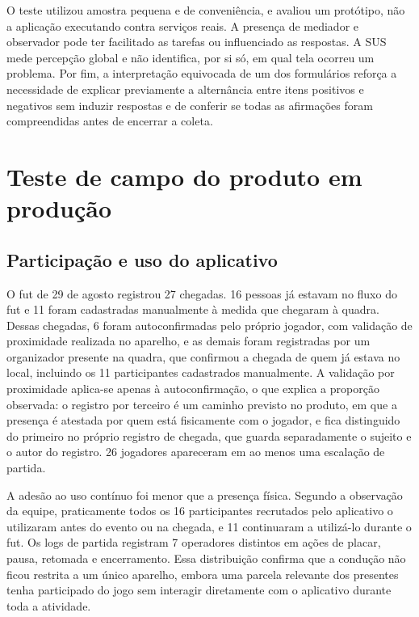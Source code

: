         O teste utilizou amostra pequena e de conveniência, e avaliou um protótipo, não a aplicação executando contra serviços reais. A presença de mediador e observador pode ter facilitado as tarefas ou influenciado as respostas. A SUS mede percepção global e não identifica, por si só, em qual tela ocorreu um problema. Por fim, a interpretação equivocada de um dos formulários reforça a necessidade de explicar previamente a alternância entre itens positivos e negativos sem induzir respostas e de conferir se todas as afirmações foram compreendidas antes de encerrar a coleta.

\section{Teste de campo do produto em produção}

    \subsection{Participação e uso do aplicativo}

        O fut de 29 de agosto registrou 27 chegadas. 16 pessoas já estavam no fluxo do fut e 11 foram cadastradas manualmente à medida que chegaram à quadra. Dessas chegadas, 6 foram autoconfirmadas pelo próprio jogador, com validação de proximidade realizada no aparelho, e as demais foram registradas por um organizador presente na quadra, que confirmou a chegada de quem já estava no local, incluindo os 11 participantes cadastrados manualmente. A validação por proximidade aplica-se apenas à autoconfirmação, o que explica a proporção observada: o registro por terceiro é um caminho previsto no produto, em que a presença é atestada por quem está fisicamente com o jogador, e fica distinguido do primeiro no próprio registro de chegada, que guarda separadamente o sujeito e o autor do registro. 26 jogadores apareceram em ao menos uma escalação de partida.

        A adesão ao uso contínuo foi menor que a presença física. Segundo a observação da equipe, praticamente todos os 16 participantes recrutados pelo aplicativo o utilizaram antes do evento ou na chegada, e 11 continuaram a utilizá-lo durante o fut. Os logs de partida registram 7 operadores distintos em ações de placar, pausa, retomada e encerramento. Essa distribuição confirma que a condução não ficou restrita a um único aparelho, embora uma parcela relevante dos presentes tenha participado do jogo sem interagir diretamente com o aplicativo durante toda a atividade.

